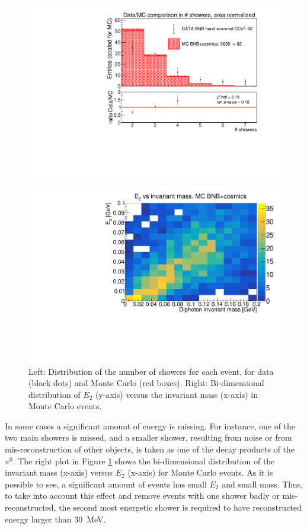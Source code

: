 \begin{figure}[!htbp]
\centering
\begin{minipage}{0.49\columnwidth}
  \includegraphics[width=0.99\columnwidth]{figures/n_showers_data_MC_comparison_mod.pdf}
\end{minipage}
\begin{minipage}{0.49\columnwidth} 
  \includegraphics[width=0.99\columnwidth]{figures/MC_mass_E2.pdf}
\end{minipage}
\caption{Left: Distribution of the number of showers for each event, for data (black dots) and Monte Carlo (red boxes). Right: Bi-dimensional distribution of $E_2$ (y-axis) versus the invariant mass (x-axis) in Monte Carlo events.}
\label{fig:mc_mass_e2}
\end{figure}

In some cases a significant amount of energy is missing. For instance, one of the two main showers is missed, and a smaller shower, resulting from noise or from mis-reconstruction of other objects, is taken as one of the decay products of the $\pi^0$. The right plot in Figure \ref{fig:mc_mass_e2} shows the bi-dimensional distribution of the invariant mass (x-axis) versus $E_2$ (x-axis) for Monte Carlo events. As it is possible to see, a significant amount of events has small $E_2$ and small mass. Thus, to take into account this effect and remove events with one shower badly or mis-reconstructed, the second most energetic shower is required to have reconstructed energy larger than 30~MeV.


